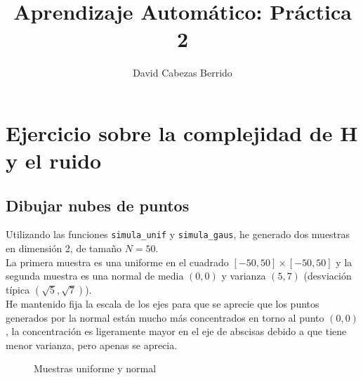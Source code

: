 \documentclass[a4]{article}
\author{David Cabezas Berrido}
\date{\vspace{-5mm}}
\title{\huge Aprendizaje Automático: Práctica 2 \HRule\vspace{-4mm}}
\begin{document}
\maketitle
\tableofcontents

\newpage

\section{Ejercicio sobre la complejidad de H y el ruido}

\subsection{Dibujar nubes de puntos}

Utilizando las funciones \texttt{simula\_unif} y \texttt{simula\_gaus},
he generado dos muestras en dimensión 2, de tamaño $N=50$. \\
La primera muestra es una uniforme en el cuadrado
$[-50,50]\times[-50,50]$ 
y la segunda muestra es una normal de media $(0,0)$ y varianza $(5,7)$ 
(desviación típica $(\sqrt{5},\sqrt{7})$). \\
He mantenido fija la escala de los ejes para que se aprecie que los puntos
generados por la normal están mucho más concentrados en torno al punto $(0,0)$,
la concentración es ligeramente mayor en el eje de abscisas 
debido a que tiene menor varianza, pero apenas se aprecia.

\vspace{-3mm}
\begin{figure}[H]
    \centering
    \caption{Muestras uniforme y normal}
    \label{fig:uniform-normal}
\end{figure}
\vspace{-6mm}
\end{document}

